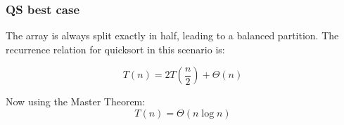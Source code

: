     \subsubsection{QS best case}
    \begin{definition}
        The array is always split exactly in half, leading to a balanced partition. The recurrence relation for quicksort in this scenario is:

        \begin{equation*}
            T(n) = 2T\left(\frac{n}{2}\right) + \Theta(n)
        \end{equation*}

        \begin{center}
        \end{center}

        \noindent Now using the Master Theorem:
        \begin{equation*}
        T(n) = \Theta(n \log n)
        \end{equation*}
    \end{definition}

